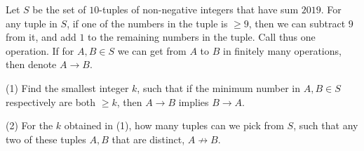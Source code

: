 Let $S$ be the set of $10$-tuples of non-negative integers that have sum $2019$. For any tuple in $S$, if one of the numbers in the tuple is $\geq 9$, then we can subtract $9$ from it, and add $1$ to the remaining numbers in the tuple. Call thus one operation. If for $A,B\in S$ we can get from $A$ to $B$ in finitely many operations, then denote $A\rightarrow B$.

(1) Find the smallest integer $k$, such that if the minimum number in $A,B\in S$ respectively are both $\geq k$, then $A\rightarrow B$ implies $B\rightarrow A$.

(2) For the $k$ obtained in (1), how many tuples can we pick from $S$, such that any two of these tuples $A,B$ that are distinct, $A\not\rightarrow B$.